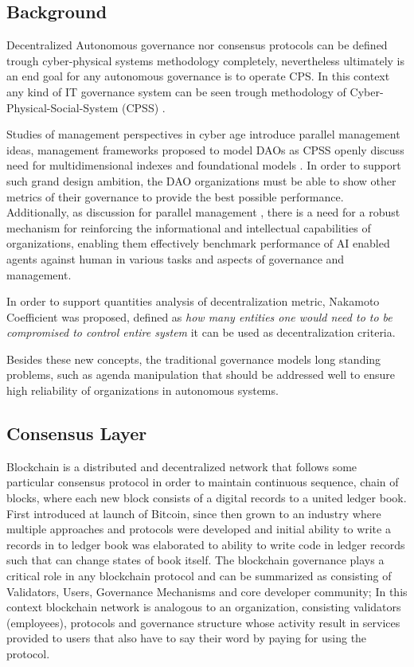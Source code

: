 \documentclass{article}
\begin{document}
\begin{CJK}{UTF8}{gbsn}
\begin{multicols}{2}
\section{Background}
Decentralized Autonomous governance nor consensus protocols can be defined trough cyber-physical systems \cite{Lee2008} methodology completely, nevertheless ultimately is an end goal for any autonomous governance is to operate CPS. In this context any kind of IT governance system can be seen trough methodology of Cyber-Physical-Social-System (CPSS) \cite{Fei2016}.


Studies of management perspectives in cyber age introduce parallel management \cite{Wang2022} ideas, management frameworks proposed to model DAOs as CPSS openly discuss need for multidimensional indexes and foundational models \cite{Juanjuan2023}. In order to support such grand design ambition, the DAO organizations must be able to show other metrics of their governance to provide the best possible performance. Additionally, as discussion for parallel management \cite{Wang2022}, there is a need for a robust mechanism for reinforcing the informational and intellectual capabilities of organizations, enabling them effectively benchmark performance of AI enabled agents against human in various tasks and aspects of governance and management.

In order to support quantities analysis of decentralization metric, Nakamoto Coefficient\cite{Balaji2017} was proposed, defined as \textit{how many entities one would need to to be compromised to control entire system} it can be used as decentralization criteria.

Besides these new concepts, the traditional governance models long standing problems, such as agenda manipulation \cite{McKelvey1976} that should be addressed well to ensure high reliability of organizations in autonomous systems.


\subsection{Consensus Layer}
Blockchain is a distributed and decentralized network that follows some particular consensus protocol in order to maintain continuous sequence, chain of blocks\cite{Merlinda2019}, where each new block consists of a digital records to a united ledger book. First introduced at launch of Bitcoin\cite{Satoshi}, since then grown to an industry where multiple approaches and protocols were developed and initial ability to write a records in to ledger book was elaborated to ability to write code in ledger records such that can change states of book itself.
The blockchain governance plays a critical role in any blockchain protocol and can be summarized as consisting of Validators, Users, Governance Mechanisms and core developer community; In this context blockchain network is analogous to an organization, consisting validators (employees), protocols and governance structure whose activity result in services provided to users that also have to say their word by paying for using the protocol.


\end{multicols}
\end{CJK}
\end{document}
